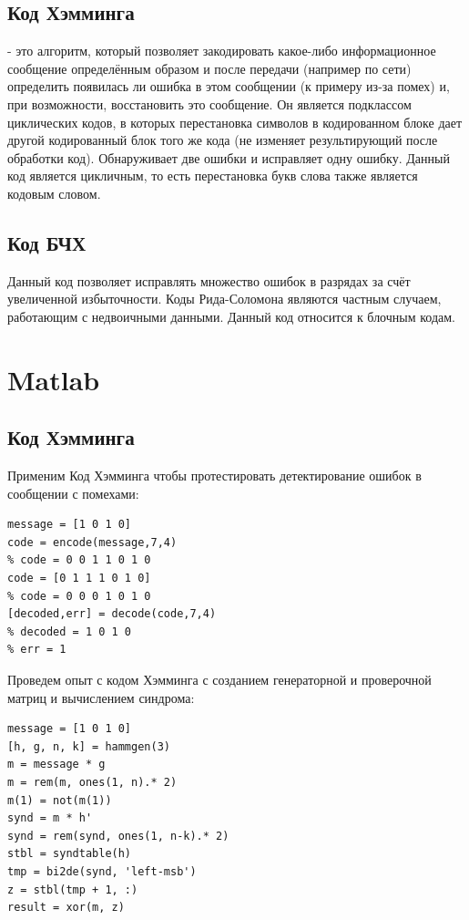 \documentclass[a4paper,14pt]{extarticle}
\begin{document}
\subsection{Код Хэмминга}
- это алгоритм, который позволяет закодировать какое-либо информационное сообщение определённым образом и после передачи (например по сети) определить появилась ли ошибка в этом сообщении (к примеру из-за помех) и, при возможности, восстановить это сообщение. Он является подклассом циклических кодов, в которых перестановка символов в кодированном блоке дает другой кодированный блок того же кода (не изменяет результирующий после обработки код). Обнаруживает две ошибки и исправляет одну ошибку. Данный код является цикличным, то есть перестановка букв слова также является кодовым словом.

\subsection{Код БЧХ}
Данный код позволяет исправлять множество ошибок в разрядах за счёт увеличенной избыточности. Коды Рида-Соломона являются частным случаем, работающим с недвоичными данными. Данный код относится к блочным кодам.

\section{Matlab}
\subsection{Код Хэмминга}

Применим Код Хэмминга чтобы протестировать детектирование ошибок в сообщении с помехами:

\begin{verbatim}
message = [1 0 1 0]
code = encode(message,7,4)
% code = 0 0 1 1 0 1 0
code = [0 1 1 1 0 1 0]
% code = 0 0 0 1 0 1 0
[decoded,err] = decode(code,7,4)
% decoded = 1 0 1 0
% err = 1
\end{verbatim}

Проведем опыт с кодом Хэмминга с созданием генераторной и проверочной матриц и вычислением синдрома:

\begin{verbatim}
message = [1 0 1 0]
[h, g, n, k] = hammgen(3)
m = message * g
m = rem(m, ones(1, n).* 2)
m(1) = not(m(1))
synd = m * h'
synd = rem(synd, ones(1, n-k).* 2)
stbl = syndtable(h)
tmp = bi2de(synd, 'left-msb')
z = stbl(tmp + 1, :)
result = xor(m, z)
\end{verbatim}
\end{document}
